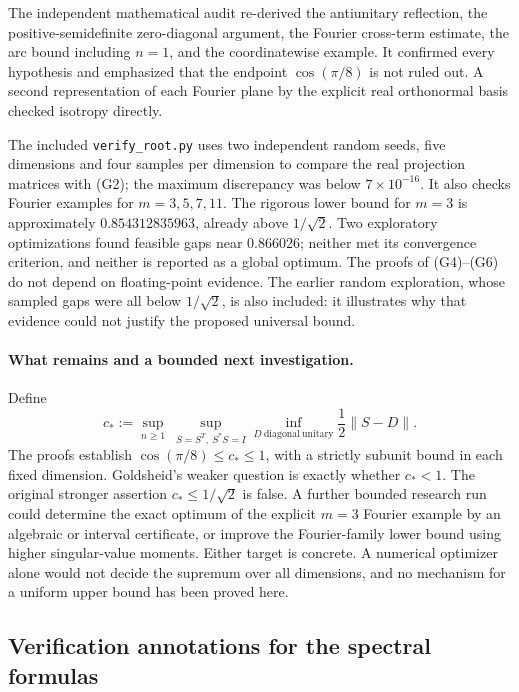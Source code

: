 \begin{remark}\oursComputed
The independent mathematical audit re-derived the antiunitary reflection,
the positive-semidefinite zero-diagonal argument, the Fourier cross-term
estimate, the arc bound including \(n=1\), and the coordinatewise example.
It confirmed every hypothesis and emphasized that the endpoint
\(\cos(\pi/8)\) is not ruled out. A second representation of each Fourier
plane by the explicit real orthonormal basis checked isotropy directly.

The included \texttt{verify\_root.py} uses two independent random seeds,
five dimensions and four samples per dimension to compare the real
projection matrices with (G2); the maximum discrepancy was below
\(7\times10^{-16}\). It also checks Fourier examples for
\(m=3,5,7,11\). The rigorous lower bound for \(m=3\) is approximately
\(0.854312835963\), already above \(1/\sqrt2\). Two exploratory
optimizations found feasible gaps near \(0.866026\); neither met its
convergence criterion, and neither is reported as a global optimum.
The proofs of (G4)--(G6) do not depend on floating-point evidence. The
earlier random exploration, whose sampled gaps were all below
\(1/\sqrt2\), is also included: it illustrates why that evidence could
not justify the proposed universal bound.
\end{remark}

\paragraph{What remains and a bounded next investigation.}
Define
\[
 c_*:=\sup_{n\ge1}\ \sup_{S=S^T,\ S^*S=I}
       \inf_{D\ \mathrm{diagonal\ unitary}}\frac12\|S-D\|.
\]
The proofs establish \(\cos(\pi/8)\le c_*\le1\), with a strictly
subunit bound in each fixed dimension. Goldsheid's weaker question is
exactly whether \(c_*<1\). The original stronger assertion
\(c_*\le1/\sqrt2\) is false. A further bounded research run could
determine the exact optimum of the explicit \(m=3\) Fourier example by
an algebraic or interval certificate, or improve the Fourier-family
lower bound using higher singular-value moments. Either target is
concrete. A numerical optimizer alone would not decide the supremum over
all dimensions, and no mechanism for a uniform upper bound has been
proved here.

\subsection{Verification annotations for the spectral formulas}
\label{dev:1981-spectral-checks}

